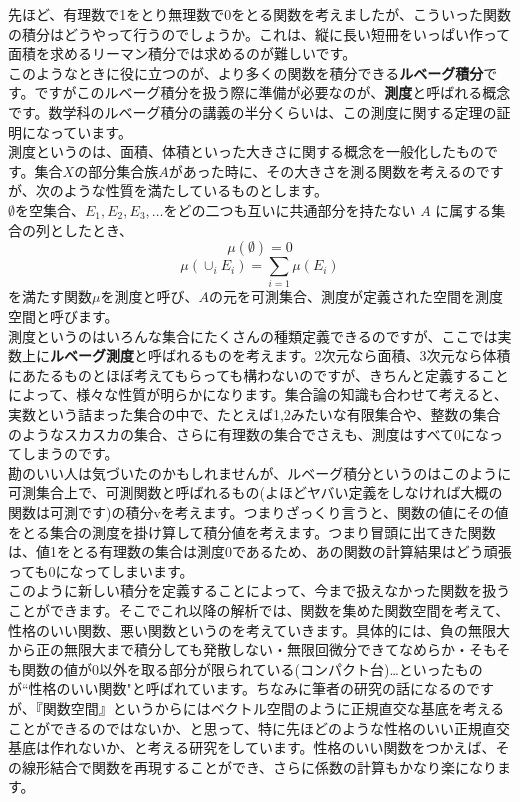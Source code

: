 先ほど、有理数で1をとり無理数で0をとる関数を考えましたが、こういった関数の積分はどうやって行うのでしょうか。これは、縦に長い短冊をいっぱい作って面積を求めるリーマン積分では求めるのが難しいです。\\
このようなときに役に立つのが、より多くの関数を積分できる{\bf ルベーグ積分}です。ですがこのルベーグ積分を扱う際に準備が必要なのが、{\bf 測度}と呼ばれる概念です。数学科のルベーグ積分の講義の半分くらいは、この測度に関する定理の証明になっています。\\
測度というのは、面積、体積といった大きさに関する概念を一般化したものです。集合$X$の部分集合族$A$があった時に、その大きさを測る関数を考えるのですが、次のような性質を満たしているものとします。\\
$\emptyset$を空集合、$E_1,E_2,E_3,\dotsc$をどの二つも互いに共通部分を持たない $A$ に属する集合の列としたとき、
\[
\mu (\emptyset) = 0
\]
\[
\mu (\cup_i E_i) = \sum_{i=1} \mu (E_i)
\]
を満たす関数$\mu$を測度と呼び、$A$の元を可測集合、測度が定義された空間を測度空間と呼びます。\\
測度というのはいろんな集合にたくさんの種類定義できるのですが、ここでは実数上に{\bf ルベーグ測度}と呼ばれるものを考えます。2次元なら面積、3次元なら体積にあたるものとほぼ考えてもらっても構わないのですが、きちんと定義することによって、様々な性質が明らかになります。集合論の知識も合わせて考えると、実数という詰まった集合の中で、たとえば{1,2}みたいな有限集合や、整数の集合のようなスカスカの集合、さらに有理数の集合でさえも、測度はすべて0になってしまうのです。\\
勘のいい人は気づいたのかもしれませんが、ルベーグ積分というのはこのように可測集合上で、可測関数と呼ばれるもの(よほどヤバい定義をしなければ大概の関数は可測です)の積分vを考えます。つまりざっくり言うと、関数の値にその値をとる集合の測度を掛け算して積分値を考えます。つまり冒頭に出てきた関数は、値1をとる有理数の集合は測度0であるため、あの関数の計算結果はどう頑張っても0になってしまいます。\\
このように新しい積分を定義することによって、今まで扱えなかった関数を扱うことができます。そこでこれ以降の解析では、関数を集めた関数空間を考えて、性格のいい関数、悪い関数というのを考えていきます。具体的には、負の無限大から正の無限大まで積分しても発散しない・無限回微分できてなめらか・そもそも関数の値が0以外を取る部分が限られている(コンパクト台)…といったものが``性格のいい関数"と呼ばれています。ちなみに筆者の研究の話になるのですが、『関数空間』というからにはベクトル空間のように正規直交な基底を考えることができるのではないか、と思って、特に先ほどのような性格のいい正規直交基底は作れないか、と考える研究をしています。性格のいい関数をつかえば、その線形結合で関数を再現することができ、さらに係数の計算もかなり楽になります。

